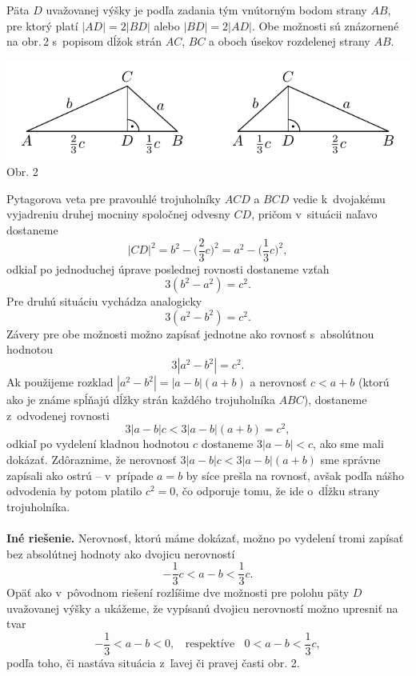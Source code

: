 \rieh Päta $D$ uvažovanej výšky je podľa zadania tým vnútorným bodom strany $AB$, pre ktorý platí $|AD| = 2|BD|$ alebo $|BD| = 2|AD|$. Obe možnosti sú znázornené na obr.\,2 s~popisom dĺžok strán $AC$, $BC$ a oboch úsekov rozdelenej strany $AB$.
\begin{center}
\includegraphics{obrazky/66D31.pdf}\\

Obr. 2
\end{center}
Pytagorova veta pre pravouhlé trojuholníky $ACD$ a $BCD$ vedie k~dvojakému vyjadreniu druhej mocniny spoločnej odvesny $CD$, pričom v~situácii naľavo dostaneme
$$|CD|^2= b^2- \bigg(\frac{2}{3}c\bigg)^2= a^2 - \bigg(\frac{1}{3}c\bigg)^2,$$
odkiaľ po jednoduchej úprave poslednej rovnosti dostaneme vzťah
$$3(b^2 - a^2) = c^2.$$
Pre druhú situáciu vychádza analogicky
$$3(a^2 -b^2) = c^2.$$
Závery pre obe možnosti možno zapísať jednotne ako rovnosť s~absolútnou hodnotou
$$3|a^2 - b^2 | = c^2.$$
Ak použijeme rozklad $|a^2 - b^2 | = |a - b|(a + b)$ a nerovnosť $c < a + b$ (ktorú ako je známe spĺňajú dĺžky strán každého trojuholníka $ABC$), dostaneme z~odvodenej rovnosti
$$3|a - b|c < 3|a - b|(a + b) = c^2,$$
odkiaľ po vydelení kladnou hodnotou $c$ dostaneme $3|a - b| < c$, ako sme mali dokázať. Zdôraznime, že nerovnosť $3|a-b|c < 3|a-b|(a+b)$ sme správne zapísali ako ostrú -- v~prípade $a = b$ by síce prešla na rovnosť, avšak podľa nášho odvodenia by potom platilo $c^2 = 0$, čo odporuje tomu, že ide o~dĺžku strany trojuholníka.\\
\\
\textbf{Iné riešenie.} Nerovnosť, ktorú máme dokázať, možno po vydelení tromi zapísať bez
absolútnej hodnoty ako dvojicu nerovností
$$-\frac{1}{3}c < a - b < \frac{1}{3}c.$$
Opäť ako v~pôvodnom riešení rozlíšime dve možnosti pre polohu päty $D$ uvažovanej výšky a ukážeme, že vypísanú dvojicu nerovností možno upresniť na tvar
$$-\frac{1}{3} < a - b < 0,\ \ \ \ \text{respektíve} \ \ \ \  0 < a - b <\frac{1}{3}c,$$
podľa toho, či nastáva situácia z~ľavej či pravej časti obr. 2.

